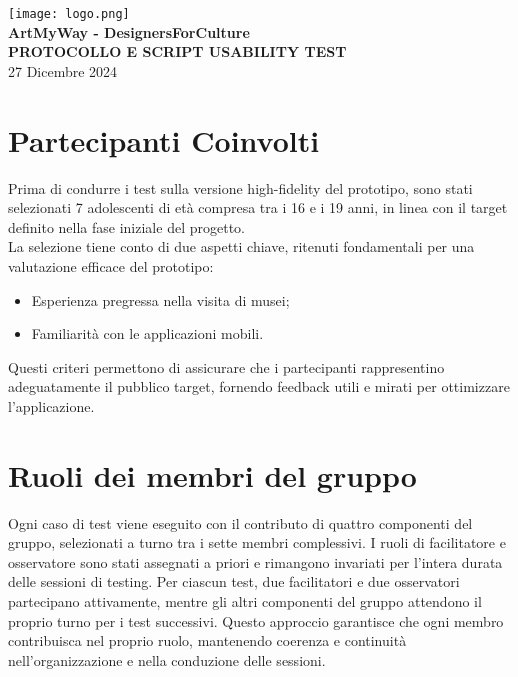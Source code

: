 \documentclass{article}
\begin{document}
\begin{center}
    \texttt{[image: logo.png]} \\[1em]
    {\LARGE \textbf{ArtMyWay - DesignersForCulture}} \\[0.5em]
    {\Large \textbf{PROTOCOLLO E SCRIPT USABILITY TEST}} \\[1.5em]
    {\large 27 Dicembre 2024}
\end{center}

\section{Partecipanti Coinvolti}
Prima di condurre i test sulla versione high-fidelity del prototipo, sono stati selezionati 7 adolescenti di et\`a compresa tra i 16 e i 19 anni, in linea con il target definito nella fase iniziale del progetto. \\ La selezione tiene conto di due aspetti chiave, ritenuti fondamentali per una valutazione efficace del prototipo:
\begin{itemize}
    \item Esperienza pregressa nella visita di musei;
    \item Familiarit\`a con le applicazioni mobili.
\end{itemize}
Questi criteri permettono di assicurare che i partecipanti rappresentino adeguatamente il pubblico target, fornendo feedback utili e mirati per ottimizzare l'applicazione.

\section{Ruoli dei membri del gruppo}
Ogni caso di test viene eseguito con il contributo di quattro componenti del gruppo, selezionati a turno tra i sette membri complessivi. I ruoli di facilitatore e osservatore sono stati assegnati a priori e rimangono invariati per l'intera durata delle sessioni di testing. Per ciascun test, due facilitatori e due osservatori partecipano attivamente, mentre gli altri componenti del gruppo attendono il proprio turno per i test successivi. Questo approccio garantisce che ogni membro contribuisca nel proprio ruolo, mantenendo coerenza e continuità nell'organizzazione e nella conduzione delle sessioni.
\end{document}
